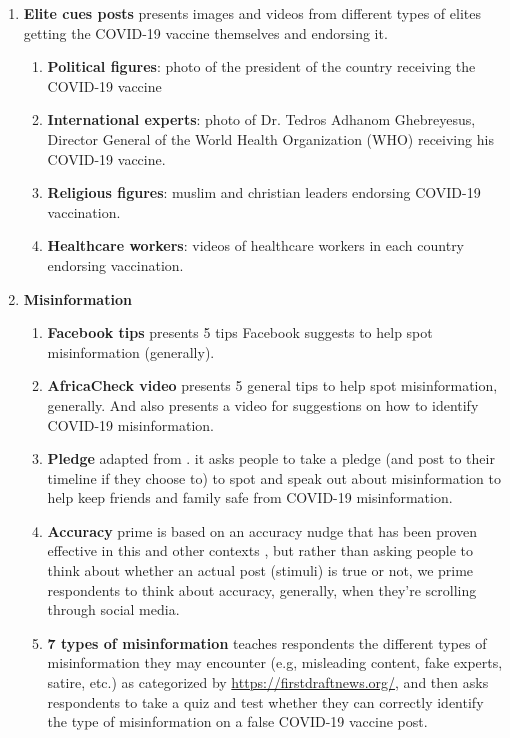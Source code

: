 \documentclass[letterpaper, 12pt, parskip=full,DIV=10]{scrartcl}
\begin{document}
\begin{enumerate}
  \item \textbf{Elite cues posts} presents images and videos from different types of elites getting the COVID-19 vaccine themselves and endorsing it. 
  \begin{enumerate}
    \item \textbf{Political figures}: photo of the president of the country receiving the COVID-19 vaccine
    \item \textbf{International experts}: photo of Dr. Tedros Adhanom Ghebreyesus, Director General of the World Health Organization (WHO) receiving his COVID-19 vaccine.
    \item \textbf{Religious figures}: muslim and christian leaders endorsing COVID-19 vaccination.
    \item \textbf{Healthcare workers}: videos of healthcare workers in each country endorsing vaccination.
  \end{enumerate}
  \item \textbf{Misinformation}
    \begin{enumerate}
    \item \textbf{Facebook tips} presents 5 tips Facebook suggests to help spot misinformation (generally).
    \item \textbf{AfricaCheck video} presents 5 general tips to help spot misinformation, generally. And also presents a video for suggestions on how to identify COVID-19 misinformation.
    \item \textbf{Pledge} adapted from \cite{offer-westort2021optimal}. it asks people to take a pledge (and post to their timeline if they choose to) to spot and speak out about misinformation to help keep friends and family safe from COVID-19 misinformation.
    \item \textbf{Accuracy} prime is based on an accuracy nudge that has been proven effective in this and other contexts \citep{pennycook2020fighting, offer-westort2021optimal}, but rather than asking people to think about whether an actual post (stimuli) is true or not, we prime respondents to think about accuracy, generally, when they're scrolling through social media.
    \item \textbf{7 types of misinformation} teaches respondents the different types of misinformation they may encounter (e.g, misleading content, fake experts, satire, etc.) as categorized by \href{First Draft}{https://firstdraftnews.org/}, and then asks respondents to take a quiz and test whether they can correctly identify the type of misinformation on a false COVID-19 vaccine post. 

\end{enumerate}
\end{enumerate}
\end{document}
